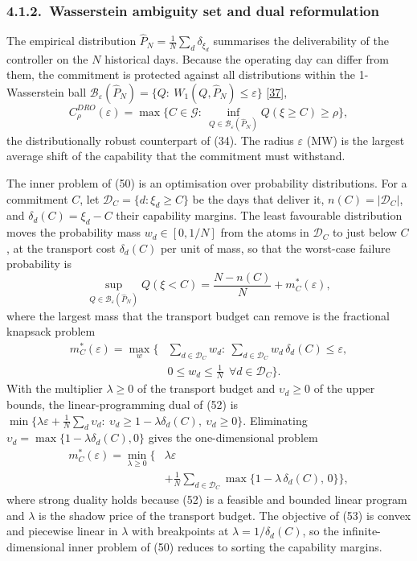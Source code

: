 \documentclass[a4paper,twocolumn,fleqn,10pt]{article}
\begin{document}
\subsubsection*{4.1.2.~Wasserstein ambiguity set and dual reformulation}

The empirical distribution \(\hat P_N=\frac1N\sum_d\delta_{\xi_d}\) summarises the deliverability of the controller on the \(N\) historical days. Because the operating day can differ from them, the commitment is protected against all distributions within the 1-Wasserstein ball \(\mathcal B_\varepsilon(\hat P_N)=\{Q:\ W_1(Q,\hat P_N)\le\varepsilon\}\) [\hyperlink{ref37}{37}], \[C^{DRO}_\rho(\varepsilon)=\max\Big\{C\in\mathcal G:\ \inf_{Q\in\mathcal B_\varepsilon(\hat P_N)}Q(\xi\ge C)\ge\rho\Big\}, \tag{50}\] the distributionally robust counterpart of (34). The radius \(\varepsilon\) (MW) is the largest average shift of the capability that the commitment must withstand.

The inner problem of (50) is an optimisation over probability distributions. For a commitment \(C\), let \(\mathcal D_C=\{d:\xi_d\ge C\}\) be the days that deliver it, \(n(C)=|\mathcal D_C|\), and \(\delta_d(C)=\xi_d-C\) their capability margins. The least favourable distribution moves the probability mass \(w_d\in[0,1/N]\) from the atoms in \(\mathcal D_C\) to just below \(C\), at the transport cost \(\delta_d(C)\) per unit of mass, so that the worst-case failure probability is \[\sup_{Q\in\mathcal B_\varepsilon(\hat P_N)}Q(\xi<C)=\frac{N-n(C)}{N}+m^*_C(\varepsilon), \tag{51}\] where the largest mass that the transport budget can remove is the fractional knapsack problem \[\begin{aligned}m^*_C(\varepsilon)=\max_{w}\Big\{&\sum_{d\in\mathcal D_C}w_d:\ \sum_{d\in\mathcal D_C}w_d\,\delta_d(C)\le\varepsilon,\\&0\le w_d\le\frac1N\ \ \forall d\in\mathcal D_C\Big\}.\end{aligned} \tag{52}\] With the multiplier \(\lambda\ge0\) of the transport budget and \(\upsilon_d\ge0\) of the upper bounds, the linear-programming dual of (52) is \(\min\{\lambda\varepsilon+\frac1N\sum_d\upsilon_d:\ \upsilon_d\ge1-\lambda\delta_d(C),\ \upsilon_d\ge0\}\). Eliminating \(\upsilon_d=\max\{1-\lambda\delta_d(C),0\}\) gives the one-dimensional problem \[\begin{aligned}m^*_C(\varepsilon)=\min_{\lambda\ge0}\Big\{&\lambda\varepsilon\\&+\frac1N\sum_{d\in\mathcal D_C}\max\{1-\lambda\,\delta_d(C),\,0\}\Big\},\end{aligned} \tag{53}\] where strong duality holds because (52) is a feasible and bounded linear program and \(\lambda\) is the shadow price of the transport budget. The objective of (53) is convex and piecewise linear in \(\lambda\) with breakpoints at \(\lambda=1/\delta_d(C)\), so the infinite-dimensional inner problem of (50) reduces to sorting the capability margins.
\end{document}
